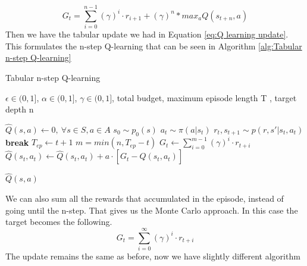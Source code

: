 \documentclass{article}
\begin{document}
\begin{equation}
    G_t = \sum_{i=0}^{n-1}(\gamma)^i \cdot r_{i+1} + (\gamma)^n*max_a Q(s_{t+n},a)
    \label{eq:Depth Target G}
\end{equation}
Then we have the tabular update we had in Equation \ref{eq:Q learning update}. 
This formulates the n-step Q-learning that can be seen in Algorithm \ref{alg:Tabular n-step Q-learning}

\begin{algorithm}[h]
    \caption{Tabular n-step Q-learning}
    \label{alg:Tabular n-step Q-learning}
 \begin{algorithmic}
     $\epsilon \in (0,1]$, $\alpha \in (0,1]$, $\gamma \in (0,1]$, total budget, maximum episode length T , target depth n
    
    \STATE $\hat{Q}(s,a) \leftarrow 0,\ \forall s \in S, a \in A$
        \STATE $s_0 \sim p_0(s)$
            \STATE $a_t \sim \pi(a|s_t)$
            \STATE $r_t,s_{t+1} \sim p(r,s'|s_t,a_t)$
                \STATE \textbf{break}
            \ENDIF
        \ENDFOR
        \STATE $T_{ep} \leftarrow t+1$
            \STATE $m = min(n,T_{ep}-t)$
                \STATE $G_t \leftarrow \sum_{i=0}^{m-1}(\gamma)^i \cdot r_{t+i}$
            \ENDIF
            \STATE $\hat{Q}(s_t,a_t) \leftarrow \hat{Q}(s_t,a_t) + a \cdot [G_t - \hat{Q}(s_t,a_t)] $
        \ENDFOR
    \ENDWHILE
    
     $\hat{Q}(s,a)$
 \end{algorithmic}
\end{algorithm}


We can also sum all the rewards that accumulated in the episode, instead of going until the n-step. That gives us the Monte Carlo approach.
In this case the target becomes the following.
\begin{equation}
    G_t = \sum_{i=0}^{\infty}(\gamma)^i \cdot r_{t+i}
\end{equation}
The update remains the same as before, now we have slightly different algorithm
\end{document}
